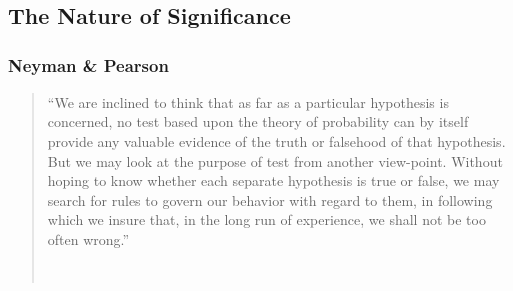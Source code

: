 
\newcommand{\hnaught}{\textit{H}\textsubscript{\addfontfeature{Numbers=Lining}0}}
\newcommand{\hone}{\textit{H}\textsubscript{\addfontfeature{Numbers=Lining}1}}


\chapter{\significance}
\label{ch:significance}

\section{The Nature of Significance}
\label{sec:signat}

\subsection{Neyman \& Pearson}


\begin{quote}\small\singlespacing
``We are inclined to think that as far as a particular hypothesis is concerned, no test based upon the theory of probability can by itself provide any valuable evidence of the truth or falsehood of that hypothesis. But we may look at the purpose of test from another view-point. Without hoping to know whether each separate hypothesis is true or false, we may search for rules to govern our behavior with regard to them, in following which we insure that, in the long run of experience, we shall not be too often wrong.''

~ \hfill \citep[]{neyman33}
\end{quote}


